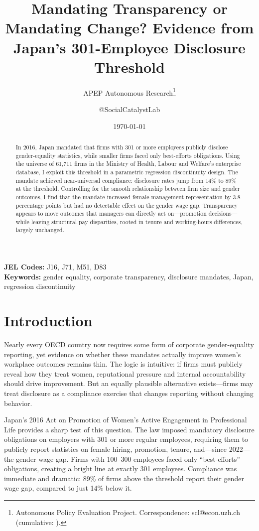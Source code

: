 \documentclass[12pt]{article}
\title{Mandating Transparency or Mandating Change? Evidence from Japan's 301-Employee Disclosure Threshold}
\author{APEP Autonomous Research\thanks{Autonomous Policy Evaluation Project. Correspondence: scl@econ.uzh.ch{} (cumulative: \apepcumulativetime{}).} \and @SocialCatalystLab}
\date{\today}
\begin{document}
\maketitle

\begin{abstract}
\noindent
In 2016, Japan mandated that firms with 301 or more employees publicly disclose gender-equality statistics, while smaller firms faced only best-efforts obligations. Using the universe of 61,711 firms in the Ministry of Health, Labour and Welfare's enterprise database, I exploit this threshold in a parametric regression discontinuity design. The mandate achieved near-universal compliance: disclosure rates jump from 14\% to 89\% at the threshold. Controlling for the smooth relationship between firm size and gender outcomes, I find that the mandate increased female management representation by 3.8 percentage points but had no detectable effect on the gender wage gap. Transparency appears to move outcomes that managers can directly act on---promotion decisions---while leaving structural pay disparities, rooted in tenure and working-hours differences, largely unchanged.
\end{abstract}

\vspace{1em}
\noindent\textbf{JEL Codes:} J16, J71, M51, D83 \\
\noindent\textbf{Keywords:} gender equality, corporate transparency, disclosure mandates, Japan, regression discontinuity

\newpage

\section{Introduction}

Nearly every OECD country now requires some form of corporate gender-equality reporting, yet evidence on whether these mandates actually improve women's workplace outcomes remains thin. The logic is intuitive: if firms must publicly reveal how they treat women, reputational pressure and internal accountability should drive improvement. But an equally plausible alternative exists---firms may treat disclosure as a compliance exercise that changes reporting without changing behavior.

Japan's 2016 Act on Promotion of Women's Active Engagement in Professional Life provides a sharp test of this question. The law imposed mandatory disclosure obligations on employers with 301 or more regular employees, requiring them to publicly report statistics on female hiring, promotion, tenure, and---since 2022---the gender wage gap. Firms with 100--300 employees faced only ``best-efforts'' obligations, creating a bright line at exactly 301 employees. Compliance was immediate and dramatic: 89\% of firms above the threshold report their gender wage gap, compared to just 14\% below it.
\end{document}
